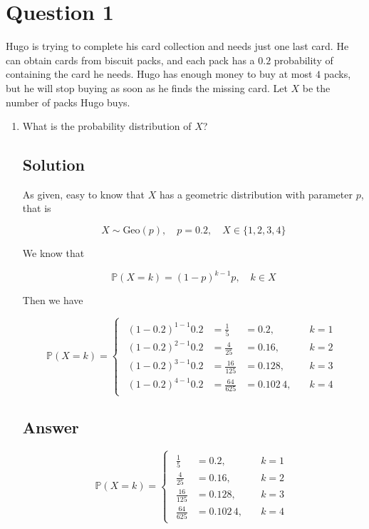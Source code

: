 \documentclass[12pt]{article}
\newcommand{\bP}{\mathbb{P}}
\begin{document}
	
	\section*{Question 1}
	
	\noindent Hugo is trying to complete his card collection and needs just one last card. He can obtain cards from biscuit packs, and each pack has a $0.2$ probability of containing the card he needs. Hugo has enough money to buy at most $4$ packs, but he will stop buying as soon as he finds the missing card. Let $X$ be the number of packs Hugo buys.
	
	\bigskip
	
	\begin{enumerate}[start=1,label={\bfseries Part \arabic*:},leftmargin=0in]
		\bigskip\item What is the probability distribution of $X$?
		
		\subsection*{Solution}
		
		As given, easy to know that $X$ has a geometric distribution with parameter $p$, that is
		
		\[X\sim\text{Geo}(p),\quad p = 0.2,\quad X \in \{1,2,3,4\}\]
		
		We know that
		
		\[\bP(X = k) = (1-p)^{k-1}p,\quad k\in X\]
		
		Then we have
		
		\[
			\bP(X = k) =
				\begin{cases}
					\begin{aligned}
						(1-0.2)^{1-1} 0.2 &= \frac{1}{5} &= 0.2, &\quad k = 1\\
						(1-0.2)^{2-1} 0.2 &= \frac{4}{25} &= 0.16, &\quad k = 2\\
						(1-0.2)^{3-1} 0.2 &= \frac{16}{125} &= 0.128, &\quad k = 3\\
						(1-0.2)^{4-1} 0.2 &= \frac{64}{625} &= 0.102\,4, &\quad k = 4
					\end{aligned}
				\end{cases}
		\]
		
		\subsection*{Answer}
		
			\[\boxed{\bP(X = k) =
				\begin{cases}
					\begin{aligned}
						\frac{1}{5} &= 0.2, &\quad k = 1\\
						\frac{4}{25} &= 0.16, &\quad k = 2\\
						\frac{16}{125} &= 0.128, &\quad k = 3\\
						\frac{64}{625} &= 0.102\,4, &\quad k = 4
					\end{aligned}
			\end{cases}}\]
		

\end{enumerate}
\end{document}
